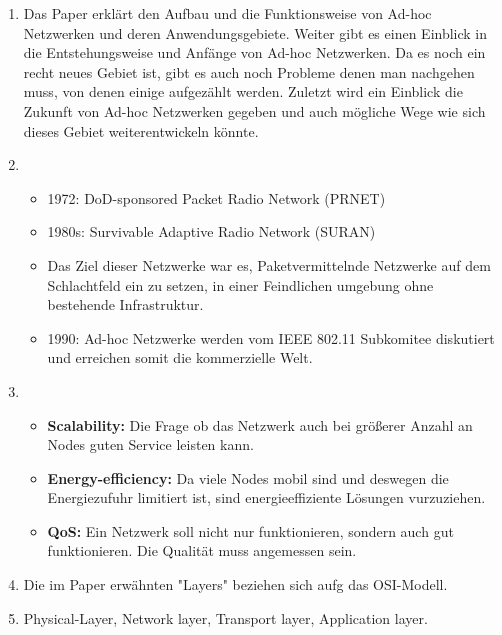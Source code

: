     \begin{enumerate}[label=\arabic*)]
        \item Das Paper erklärt den Aufbau und die Funktionsweise von Ad-hoc Netzwerken und deren Anwendungsgebiete. Weiter gibt es einen Einblick in die Entstehungsweise und Anfänge von Ad-hoc Netzwerken. Da es noch ein recht neues Gebiet ist, gibt es auch noch Probleme denen man nachgehen muss, von denen einige aufgezählt werden. Zuletzt wird ein Einblick die Zukunft von Ad-hoc Netzwerken gegeben und auch mögliche Wege wie sich dieses Gebiet weiterentwickeln könnte.
        \pagebreak
        \item \begin{itemize}
            \item 1972: DoD-sponsored Packet Radio Network (PRNET)
            \item 1980s: Survivable Adaptive Radio Network (SURAN)
            \item Das Ziel dieser Netzwerke war es, Paketvermittelnde Netzwerke auf dem Schlachtfeld ein zu setzen, in einer Feindlichen umgebung ohne bestehende Infrastruktur.
            \item 1990: Ad-hoc Netzwerke werden vom IEEE 802.11 Subkomitee diskutiert und erreichen somit die kommerzielle Welt. 
        \end{itemize}
        
        \item \begin{itemize}
            \item \textbf{Scalability:} Die Frage ob das Netzwerk auch bei größerer Anzahl an Nodes guten Service leisten kann.
            
            \item \textbf{Energy-efficiency:} Da viele Nodes mobil sind und deswegen die Energiezufuhr limitiert ist, sind energieeffiziente Lösungen vurzuziehen.
            
            \item \textbf{QoS:} Ein Netzwerk soll nicht nur funktionieren, sondern auch gut funktionieren. Die Qualität muss angemessen sein.
        \end{itemize}
        
        \item Die im Paper erwähnten "Layers" beziehen sich aufg das OSI-Modell.
        
        \item Physical-Layer, Network layer, Transport layer, Application layer.
    \end{enumerate}


